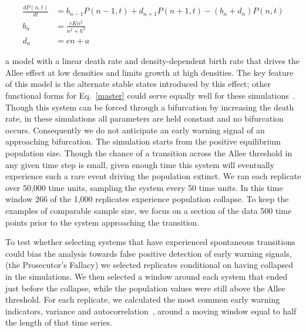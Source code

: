 \documentclass[authoryear,5p]{elsarticle}
\begin{document}
\begin{align}
  \frac{dP(n,t)}{dt} &= b_{n-1} P(n-1,t) + d_{n+1}P(n+1,t) - (b_n+d_n) P(n,t)  \label{master} \\
    b_n &= \frac{e K n^2}{n^2 + h^2} \\
    d_n &= e n + a
\end{align}

a model with a linear death rate and density-dependent birth
rate that drives the Allee effect at low densities and limits
growth at high densities.  The key feature of this model is the
alternate stable states introduced by this effect; other functional
forms for Eq.~\eqref{master} could serve equally well for these
simulations~\citep[see \emph{e.g.}][]{Scheffer2001}.  Though this
system can be forced through a bifurcation by increasing
the death rate, in these simulations all parameters are held constant
and no bifurcation occurs.  Consequently we do not anticipate an early
warning signal of an approaching bifurcation.  The simulation starts
from the positive equilibrium population size.  Though the chance of
a transition across the Allee threshold in any given time step is 
small, given enough time this system will eventually experience such a
rare event driving the population extinct.  We ran each replicate over
50,000 time units, sampling the system every 50 time units.  In this
time window 266 of the 1,000 replicates experience population collapse.
To keep the examples of comparable sample size, we focus on a section of
the data 500 time points prior to the system approaching the transition.

To test whether selecting systems that have experienced
spontaneous transitions could bias the analysis towards false
positive detection of early warning signals, (the Prosecutor's
Fallacy) we selected replicates conditional on having collapsed
in the simulations.  We then selected a window around each system
that ended just before the collapse, while the population values
were still above the Allee threshold.  For each replicate, we
calculated the most common early warning indicators, variance and
autocorrelation~\citep[\emph{e.g.}][]{Carpenter2006,Dakos2008,Scheffer2009},
around a moving window equal to half the length of that time series.
\end{document}
